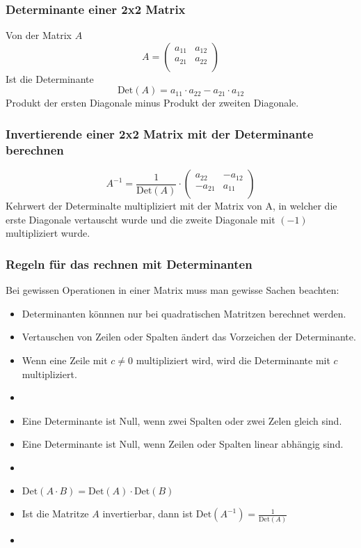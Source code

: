 \subsubsection{Determinante einer 2x2 Matrix}
Von der Matrix $A$
\[ A =
  \begin {pmatrix}
    a_{11} & a_{12} \\
    a_{21} & a_{22} \\
  \end {pmatrix} \]
Ist die Determinante
\[ \text{Det}(A) = 
    a_{11} \cdot a_{22} - a_{21} \cdot a_{12} \]
Produkt der ersten Diagonale minus Produkt der zweiten Diagonale.

\subsubsection{Invertierende einer 2x2 Matrix mit der Determinante berechnen}
\[ A^{-1} = \frac{1}{\text{Det}(A)} \cdot 
  \begin {pmatrix}
    a_{22} & -a_{12} \\
    -a_{21} & a_{11} \\
  \end {pmatrix} \]
Kehrwert der Determinalte multipliziert mit der Matrix von A, in welcher
die erste Diagonale vertauscht wurde und die zweite Diagonale mit $(-1)$
multipliziert wurde.

\subsubsection{Regeln für das rechnen mit Determinanten}
Bei gewissen Operationen in einer Matrix muss man gewisse Sachen
beachten:
\begin{itemize}
  \item Determinanten könnnen nur bei quadratischen Matritzen berechnet
    werden.
  \item Vertauschen von Zeilen oder Spalten ändert das Vorzeichen der
    Determinante.
  \item Wenn eine Zeile mit $c \ne 0$ multipliziert wird, wird die
    Determinante mit $c$ multipliziert.
  \item {}
  \item Eine Determinante ist Null, wenn zwei Spalten oder zwei Zelen
    gleich sind.
  \item Eine Determinante ist Null, wenn Zeilen oder Spalten linear
    abhängig sind.
  \item {}
  \item $\text{Det}(A \cdot B) = \text{Det}(A) \cdot \text{Det}(B)$
  \item Ist die Matritze $A$ invertierbar, dann ist $\text{Det}(A^{-1}) =
    \frac{1}{\text{Det}(A)}$
  \item {}
\end{itemize}



